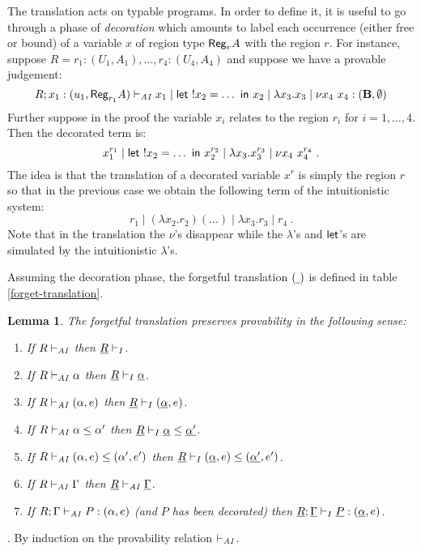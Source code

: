 \documentclass[11pt]{article}
\newtheorem{lemma}[theorem]{Lemma}
\newcommand{\Proof}{\noindent {\sc Proof}. }
\newcommand{\hyp}[3]{#1:(#2, #3)}
\newcommand{\letm}[3]{{\sf let} \ ! #1 = #2 \ {\sf in} \ #3}    \newcommand{\tertype}{{\bf 1}}
\newcommand{\behtype}{{\bf B}}
\newcommand{\s}[1]{{\sf #1}}    \newcommand{\vc}[1]{{\bf #1}}
\newcommand{\new}[2]{\nu #1 \ #2}
\newcommand{\regtype}[2]{{\sf Reg}_{#1} #2}
\begin{document}
The translation acts on typable programs.  In order to define it, it
is useful to go through a phase of {\em decoration} which amounts to label
each occurrence (either free or bound) of a variable $x$ of region 
type $\regtype{r}{A}$ with the region $r$.  
For instance,  suppose $R=\hyp{r_{1}}{U_{1}}{A_{1}},\ldots,\hyp{r_{4}}{U_{4}}{A_{4}}$ and
suppose we have a provable judgement:
\[
R; \hyp{x_{1}}{u_{1}}{\regtype{r_{1}}{A}} \AIGives 
x_1 \mid \letm{x_{2}}{\ldots}{x_{2}} \mid 
\lambda x_3.x_3 \mid \new{x_{4}}{x_4} : (\behtype,\emptyset)
\]
Further suppose in the proof the variable $x_i$ relates to the region $r_i$ for $i=1,\ldots,4$.
Then the decorated term is:
\[
x_{1}^{r_{1}} \mid \letm{x_{2}}{\ldots}{x_{2}^{r_{2}}} \mid 
\lambda x_3.x_{3}^{r_{3}} \mid \new{x_{4}}{x_{4}^{r_{4}}} ~.
\]
The idea is that the translation of a
decorated variable $x^r$ is simply the region $r$ so that in the previous
case we obtain the following term of the intuitionistic system:
\[
r_{1} \mid (\lambda x_2.r_2)(\ldots) \mid 
\lambda x_3.r_{3} \mid r_{4} ~.
\]
Note that in the translation the $\nu$'s disappear while the 
$\lambda$'s and $\s{let}$'s are simulated by the intuitionistic
$\lambda$'s. 

Assuming the decoration phase, the forgetful translation $(\underline{~})$ is defined
in table \ref{forget-translation}.


\begin{lemma} 
The forgetful translation preserves provability
in the following sense:

\begin{enumerate}

\item If $R\vdash_{{\it AI}}$ then $\underline{R}\vdash_{I}$.

\item If $R\vdash_{{\it AI}} \alpha$ then $\underline{R} \vdash_{I} \underline{\alpha}$.

\item If $R\vdash_{{\it AI}} (\alpha,e)$ then $\underline{R} \vdash_{I} (\underline{\alpha},e)$.

\item If $R\vdash_{{\it AI}} \alpha \leq \alpha'$ then
$\underline{R} \vdash_{I} \underline{\alpha}\leq \underline{\alpha'}$.

\item If $R\vdash_{{\it AI}} (\alpha,e)\leq (\alpha',e')$ then
$\underline{R} \vdash_{I} (\underline{\alpha},e) \leq (\underline{\alpha'},e')$.

\item If $R\vdash_{{\it AI}} \Gamma$ 
then $\underline{R} \vdash_{{\it AI}} \underline{\Gamma}$.

\item If $R;\Gamma \vdash_{{\it AI}} P:(\alpha,e)$ (and $P$ has
been decorated) then
$\underline{R};\underline{\Gamma} \vdash_{I} \underline{P}:(\underline{\alpha},e)$.
\end{enumerate}
\end{lemma}
\Proof
By induction on the provability relation $\vdash_{{\it AI}}$.
\end{document}
